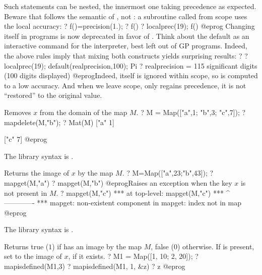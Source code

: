 Such  statements can be nested, the innermost one taking
precedence as expected. Beware that  follows the semantic of
, not : a subroutine called from  scope
uses the local accuracy:
\bprog
? f()=precision(1.);
? f()
? localprec(19); f()
@eprog\noindent
{} Changing  itself in programs is
now deprecated in favor of . Think about the
 default as an interactive command for the 
interpreter, best left out of GP programs. Indeed, the above rules
imply that mixing both constructs yields surprising results:
\bprog
? 
? localprec(19); default(realprecision,100);  Pi
? \p
    realprecision = 115 significant digits (100 digits displayed)
@eprog\noindent Indeed,  itself is ignored within
 scope, so  is computed to a low accuracy. And when
we leave  scope,  only regains precedence,
it is not ``restored'' to the original value.

\label{se:mapdelete}
Removes $x$ from the domain of the map $M$.
\bprog
? M = Map(["a",1; "b",3; "c",7]);
? mapdelete(M,"b");
? Mat(M)
["a" 1]

["c" 7]
@eprog

The library syntax is .

\label{se:mapget}
Returns the image of $x$ by the map $M$.
\bprog
? M=Map(["a",23;"b",43]);
? mapget(M,"a")
? mapget(M,"b")
@eprog\noindent Raises an exception when the key $x$ is not present in $M$.
\bprog
? mapget(M,"c")
  ***   at top-level: mapget(M,"c")
  ***                 ^-------------
  *** mapget: non-existent component in mapget: index not in map
@eprog

The library syntax is .

\label{se:mapisdefined}
Returns true ($1$) if  has an image by the map $M$, false ($0$)
otherwise. If  is present, set  to the image of $x$, if it exists.
\bprog
? M1 = Map([1, 10; 2, 20]);
? mapisdefined(M1,3)
? mapisdefined(M1, 1, &z)
? z
@eprog

